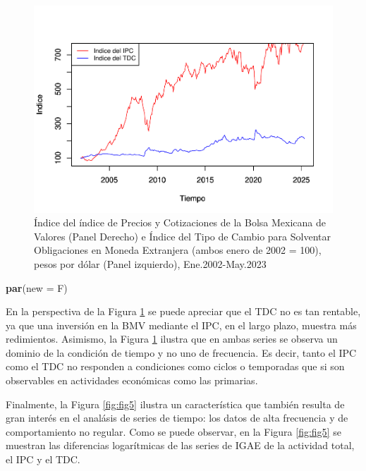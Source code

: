 \documentclass[
]{book}
\newenvironment{Shaded}{\begin{snugshade}}{\end{snugshade}}
\newcommand{\AttributeTok}[1]{\textcolor[rgb]{0.13,0.29,0.53}{#1}}
\newcommand{\FunctionTok}[1]{\textcolor[rgb]{0.13,0.29,0.53}{\textbf{#1}}}
\newcommand{\NormalTok}[1]{#1}
\begin{document}
\begin{figure}

{\centering \includegraphics{Notas-Series-Tiempo_files/figure-latex/fig4-1} 

}

\caption{Índice del índice de Precios y Cotizaciones de la Bolsa Mexicana de Valores (Panel Derecho) e Índice del Tipo de Cambio para Solventar Obligaciones en Moneda Extranjera (ambos enero de 2002 = 100), pesos por dólar (Panel izquierdo), Ene.2002-May.2023 }\label{fig:fig4}
\end{figure}

\begin{Shaded}
\begin{Highlighting}[]
\FunctionTok{par}\NormalTok{(}\AttributeTok{new =}\NormalTok{ F)}
\end{Highlighting}
\end{Shaded}

En la perspectiva de la Figura \ref{fig:fig4} se puede apreciar que el TDC no es tan rentable, ya que una inversión en la BMV mediante el IPC, en el largo plazo, muestra más redimientos. Asimismo, la Figura \ref{fig:fig4} ilustra que en ambas series se observa un dominio de la condición de tiempo y no uno de frecuencia. Es decir, tanto el IPC como el TDC no responden a condiciones como ciclos o temporadas que si son observables en actividades económicas como las
primarias.

Finalmente, la Figura \ref{fig:fig5} ilustra un característica que también resulta de gran interés en el analásis de series de tiempo: los datos de alta frecuencia y de comportamiento no regular. Como se puede observar, en la Figura \ref{fig:fig5} se muestran las diferencias logarítmicas de las series de IGAE de la actividad total, el IPC y el TDC.
\end{document}
